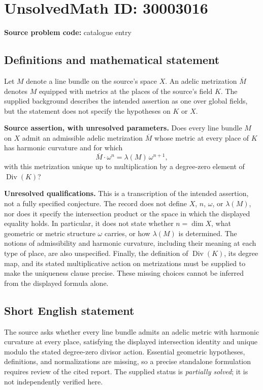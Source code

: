 \documentclass[11pt]{article}
\begin{document}
\section*{UnsolvedMath ID: 30003016}
\textbf{Source problem code:} catalogue entry
\subsection{Definitions and mathematical statement}
Let \(M\) denote a line bundle on the source's space \(X\). An adelic metrization \(\overline M\) denotes \(M\) equipped with metrics at the places of the source's field \(K\). The supplied background describes the intended assertion as one over global fields, but the statement does not specify the hypotheses on \(K\) or \(X\).

\textbf{Source assertion, with unresolved parameters.} Does every line bundle \(M\) on \(X\) admit an admissible adelic metrization \(\overline M\) whose metric at every place of \(K\) has harmonic curvature and for which
\[
\overline M\cdot\omega^n=\lambda(M)\,\omega^{n+1},
\]
with this metrization unique up to multiplication by a degree-zero element of \(\operatorname{Div}(K)\)?

\textbf{Unresolved qualifications.} This is a transcription of the intended assertion, not a fully specified conjecture. The record does not define \(X\), \(n\), \(\omega\), or \(\lambda(M)\), nor does it specify the intersection product or the space in which the displayed equality holds. In particular, it does not state whether \(n=\dim X\), what geometric or metric structure \(\omega\) carries, or how \(\lambda(M)\) is determined. The notions of admissibility and harmonic curvature, including their meaning at each type of place, are also unspecified. Finally, the definition of \(\operatorname{Div}(K)\), its degree map, and its stated multiplicative action on metrizations must be supplied to make the uniqueness clause precise. These missing choices cannot be inferred from the displayed formula alone.
\subsection{Short English statement}
The source asks whether every line bundle admits an adelic metric with harmonic curvature at every place, satisfying the displayed intersection identity and unique modulo the stated degree-zero divisor action. Essential geometric hypotheses, definitions, and normalizations are missing, so a precise standalone formulation requires review of the cited report. The supplied status is \emph{partially solved}; it is not independently verified here.
\end{document}
